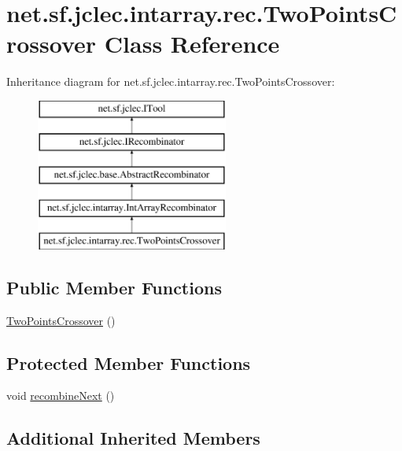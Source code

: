 \hypertarget{classnet_1_1sf_1_1jclec_1_1intarray_1_1rec_1_1_two_points_crossover}{\section{net.\-sf.\-jclec.\-intarray.\-rec.\-Two\-Points\-Crossover Class Reference}
\label{classnet_1_1sf_1_1jclec_1_1intarray_1_1rec_1_1_two_points_crossover}
}
Inheritance diagram for net.\-sf.\-jclec.\-intarray.\-rec.\-Two\-Points\-Crossover\-:\begin{figure}[H]
\begin{center}
\leavevmode
\includegraphics[height=5.000000cm]{classnet_1_1sf_1_1jclec_1_1intarray_1_1rec_1_1_two_points_crossover}
\end{center}
\end{figure}
\subsection*{Public Member Functions}
\begin{DoxyCompactItemize}
\item 
\hyperlink{classnet_1_1sf_1_1jclec_1_1intarray_1_1rec_1_1_two_points_crossover_ab166c68676cf12d4330af597aa816e12}{Two\-Points\-Crossover} ()
\end{DoxyCompactItemize}
\subsection*{Protected Member Functions}
\begin{DoxyCompactItemize}
\item 
void \hyperlink{classnet_1_1sf_1_1jclec_1_1intarray_1_1rec_1_1_two_points_crossover_a29ac2c3118a586d806d638dfcfffd3f6}{recombine\-Next} ()
\end{DoxyCompactItemize}
\subsection*{Additional Inherited Members}


